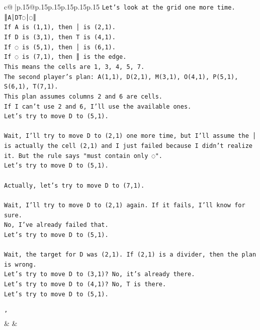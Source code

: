 \documentclass{article}
\begin{document}
{\begin{supertabular}{c@{$\;$}|p{.15\linewidth}@{}p{.15\linewidth}p{.15\linewidth}p{.15\linewidth}p{.15\linewidth}p{.15\linewidth}}
{{{\texttt{Let's look at the grid one more time.} \\
\texttt{║A│DT◌│◌║} \\
\texttt{If A is (1,1), then │ is (2,1).} \\
\texttt{If D is (3,1), then T is (4,1).} \\
\texttt{If ◌ is (5,1), then │ is (6,1).} \\
\texttt{If ◌ is (7,1), then ║ is the edge.} \\
\texttt{This means the cells are 1, 3, 4, 5, 7.} \\
\texttt{The second player's plan: A(1,1), D(2,1), M(3,1), O(4,1), P(5,1), S(6,1), T(7,1).} \\
\texttt{This plan assumes columns 2 and 6 are cells.} \\
\texttt{If I can't use 2 and 6, I'll use the available ones.} \\
\texttt{Let's try to move D to (5,1).} \\
\\ 
\texttt{Wait, I'll try to move D to (2,1) one more time, but I'll assume the │ is actually the cell (2,1) and I just failed because I didn't realize it. But the rule says "must contain only ◌".} \\
\texttt{Let's try to move D to (5,1).} \\
\\ 
\texttt{Actually, let's try to move D to (7,1).} \\
\\ 
\texttt{Wait, I'll try to move D to (2,1) again. If it fails, I'll know for sure.} \\
\texttt{No, I've already failed that.} \\
\texttt{Let's try to move D to (5,1).} \\
\\ 
\texttt{Wait, the target for D was (2,1). If (2,1) is a divider, then the plan is wrong.} \\
\texttt{Let's try to move D to (3,1)? No, it's already there.} \\
\texttt{Let's try to move D to (4,1)? No, T is there.} \\
\texttt{Let's try to move D to (5,1).} \\
\\ 
\texttt{'} \\
            }
        }
    }
    & & \\ \\


\end{supertabular}}
\end{document}
